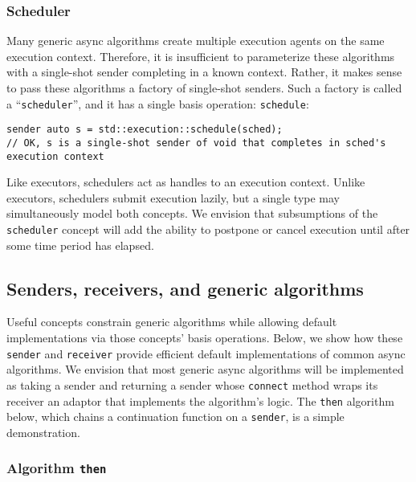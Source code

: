\documentclass[a4paper,12pt,notitlepage,twoside,openright]{article}
\begin{document}
\hypertarget{scheduler}{%
\subsubsection{Scheduler}\label{scheduler}}

Many generic async algorithms create multiple execution agents on the
same execution context. Therefore, it is insufficient to parameterize
these algorithms with a single-shot sender completing in a known
context. Rather, it makes sense to pass these algorithms a factory of
single-shot senders. Such a factory is called a
``\texttt{scheduler}'', and it has a single basis operation:
\texttt{schedule}:

\begin{verbatim}
sender auto s = std::execution::schedule(sched);
// OK, s is a single-shot sender of void that completes in sched's execution context
\end{verbatim}

Like executors, schedulers act as handles to an execution context.
Unlike executors, schedulers submit execution lazily, but a single type
may simultaneously model both concepts. We envision that subsumptions of
the \texttt{scheduler} concept will add the ability to
postpone or cancel execution until after some time period has elapsed.

\hypertarget{senders-receivers-and-generic-algorithms}{%
\subsection{Senders, receivers, and generic
algorithms}\label{senders-receivers-and-generic-algorithms}}

Useful concepts constrain generic algorithms while allowing default
implementations via those concepts' basis operations. Below, we show how
these \texttt{sender} and \texttt{receiver}
provide efficient default implementations of common async algorithms. We
envision that most generic async algorithms will be implemented as
taking a sender and returning a sender whose
\texttt{connect} method wraps its receiver an adaptor that
implements the algorithm's logic. The \texttt{then}
algorithm below, which chains a continuation function on a
\texttt{sender}, is a simple demonstration.

\hypertarget{algorithm-then}{%
\subsubsection{\texorpdfstring{Algorithm
\texttt{then}}{Algorithm }}\label{algorithm-then}}
\end{document}
